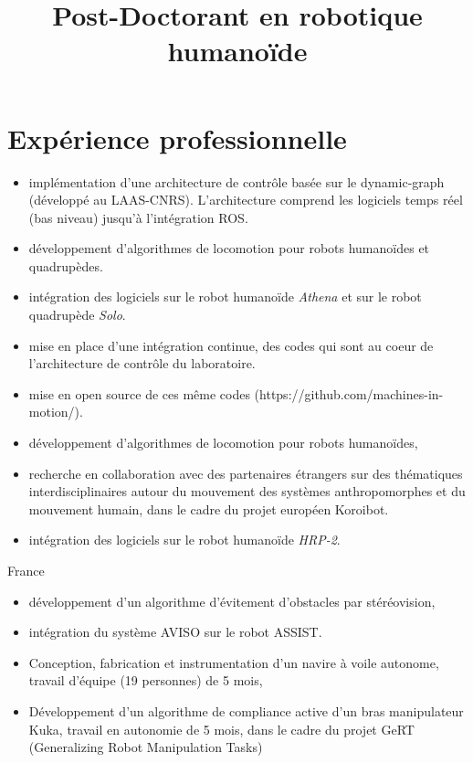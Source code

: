 \documentclass[11pt,a4paper,sans]{moderncv}        %
\title{Post-Doctorant en robotique humano\"ide}            %
\newcommand{\items}{\item \hspace{2mm}}
\begin{document}

\makecvtitle
\vspace*{-1cm}

\section{Exp\'erience professionnelle}
{
  \begin{itemize}%
    \items impl\'ementation d'une architecture de contr\^ole bas\'ee sur le
    dynamic-graph (d\'evelopp\'e au LAAS-CNRS). L'architecture comprend
    les logiciels temps r\'eel (bas niveau) jusqu'\`a l'int\'egration ROS.
    \items d\'eveloppement d'algorithmes de locomotion pour robots humano\"ides
    et quadrup\`edes.
    \items int\'egration des logiciels sur le robot humano\"ide \emph{Athena} et
    sur le robot quadrup\`ede \emph{Solo}.
    \items mise en place d'une int\'egration continue, des codes qui sont au
    coeur de l'architecture de contr\^ole du laboratoire.
    \items mise en open source de ces m\^eme codes
    (https://github.com/machines-in-motion/).
  \end{itemize}
}
{
  \begin{itemize}%
    \items d\'eveloppement d'algorithmes de locomotion pour robots humano\"ides,
    \items recherche en collaboration avec des partenaires \'etrangers sur des
    th\'ematiques interdisciplinaires autour du mouvement des syst\`emes
    anthropomorphes et du mouvement humain, dans le cadre du projet europ\'een
    Koroibot.
    \items int\'egration des logiciels sur le robot humano\"ide \emph{HRP-2}.
  \end{itemize}
}
%
%
{France}
{
  \begin{itemize}%
    \items d\'eveloppement d'un algorithme d'\'evitement d'obstacles par
    st\'er\'eovision,
    \items int\'egration du syst\`eme AVISO sur le robot ASSIST.
  \end{itemize}
}
%
%
{
  \begin{itemize}%
    \items Conception, fabrication et instrumentation d'un navire \`a voile autonome,
    travail d'\'equipe (19 personnes) de 5 mois,
  \end{itemize}
}
%
%
%
{
  \begin{itemize}%
    \items D\'eveloppement d'un algorithme de compliance active d'un bras manipulateur Kuka,
    travail en autonomie de 5 mois, dans le cadre du projet GeRT (Generalizing Robot Manipulation Tasks)
  \end{itemize}
}
\end{document}
